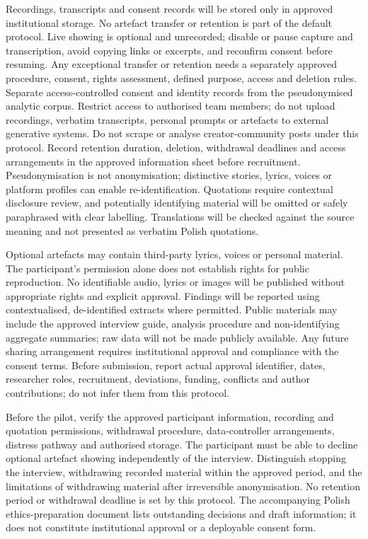 Recordings, transcripts and consent records will be stored only in approved institutional storage. No artefact transfer or retention is part of the default protocol. Live showing is optional and unrecorded; disable or pause capture and transcription, avoid copying links or excerpts, and reconfirm consent before resuming. Any exceptional transfer or retention needs a separately approved procedure, consent, rights assessment, defined purpose, access and deletion rules. Separate access-controlled consent and identity records from the pseudonymised analytic corpus. Restrict access to authorised team members; do not upload recordings, verbatim transcripts, personal prompts or artefacts to external generative systems. Do not scrape or analyse creator-community posts under this protocol. Record retention duration, deletion, withdrawal deadlines and access arrangements in the approved information sheet before recruitment. Pseudonymisation is not anonymisation; distinctive stories, lyrics, voices or platform profiles can enable re-identification. Quotations require contextual disclosure review, and potentially identifying material will be omitted or safely paraphrased with clear labelling. Translations will be checked against the source meaning and not presented as verbatim Polish quotations.

Optional artefacts may contain third-party lyrics, voices or personal material. The participant's permission alone does not establish rights for public reproduction. No identifiable audio, lyrics or images will be published without appropriate rights and explicit approval. Findings will be reported using contextualised, de-identified extracts where permitted. Public materials may include the approved interview guide, analysis procedure and non-identifying aggregate summaries; raw data will not be made publicly available. Any future sharing arrangement requires institutional approval and compliance with the consent terms. Before submission, report actual approval identifier, dates, researcher roles, recruitment, deviations, funding, conflicts and author contributions; do not infer them from this protocol.

Before the pilot, verify the approved participant information, recording and quotation permissions, withdrawal procedure, data-controller arrangements, distress pathway and authorised storage. The participant must be able to decline optional artefact showing independently of the interview. Distinguish stopping the interview, withdrawing recorded material within the approved period, and the limitations of withdrawing material after irreversible anonymisation. No retention period or withdrawal deadline is set by this protocol. The accompanying Polish ethics-preparation document lists outstanding decisions and draft information; it does not constitute institutional approval or a deployable consent form.
